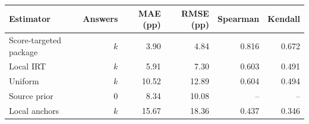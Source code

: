 \begin{tabular}{lrrrrr}
\toprule
Estimator & Answers & MAE (pp) & RMSE (pp) & Spearman & Kendall\\
\midrule
Score-targeted package & $k$ & 3.90 & 4.84 & 0.816 & 0.672 \\
Local IRT & $k$ & 5.91 & 7.30 & 0.603 & 0.491 \\
Uniform & $k$ & 10.52 & 12.89 & 0.604 & 0.494 \\
Source prior & 0 & 8.34 & 10.08 & -- & -- \\
Local anchors & $k$ & 15.67 & 18.36 & 0.437 & 0.346 \\
\bottomrule
\end{tabular}
